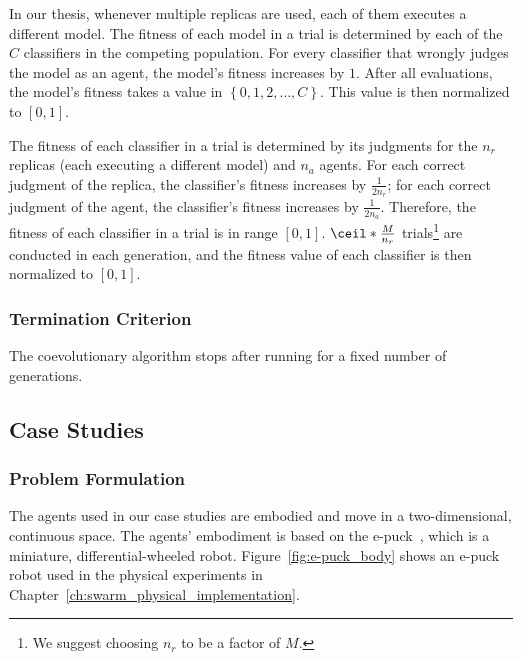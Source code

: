 In our thesis, whenever multiple replicas are used, each of them executes a different model. The fitness of each model in a trial is determined by each of the $C$ classifiers in the competing population. For every classifier that wrongly judges the model as an agent, the model's fitness increases by $1$. After all evaluations, the model's fitness takes a value in $\left\{0, 1, 2, \dots, C \right\}$. This value is then normalized to $[0, 1]$. 

The fitness of each classifier in a trial is determined by its judgments for the $n_r$ replicas (each executing a different model) and $n_a$ agents. For each correct judgment of the replica, the classifier's fitness increases by $\frac{1}{2 n_r}$; for each correct judgment of the agent, the classifier's fitness increases by $\frac{1}{2 n_a}$. Therefore, the fitness of each classifier in a trial is in range $[0, 1]$. $\ceil*{\frac{M}{n_r}}$ trials\footnote{We suggest choosing $n_r$ to be a factor of $M$.} are conducted in each generation, and the fitness value of each classifier is then normalized to $[0, 1]$.

\subsubsection{Termination Criterion}

The coevolutionary algorithm stops after running for a fixed number of generations.

\subsection{Case Studies}\label{sec:case_studies_swarm_simulation}

\subsubsection{Problem Formulation}
The agents used in our case studies are embodied and move in a two-dimensional, continuous space. The agents' embodiment is based on the e-puck~\cite{e-puck}, which is a miniature, differential-wheeled robot. Figure~\ref{fig:e-puck_body} shows an e-puck robot used in the physical experiments in Chapter~\ref{ch:swarm_physical_implementation}. 

